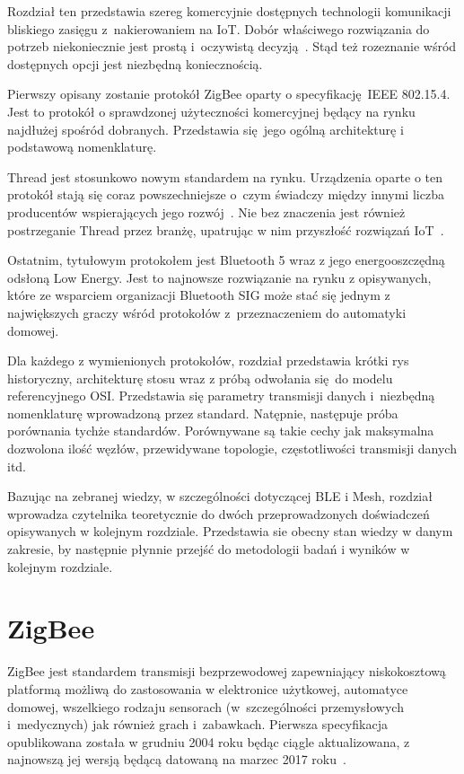Rozdział ten przedstawia szereg komercyjnie dostępnych technologii komunikacji
bliskiego zasięgu z~nakierowaniem na \gls{IoT}. Dobór właściwego rozwiązania do potrzeb
niekoniecznie jest prostą i~oczywistą decyzją~\cite{lethaby_wireless_2017, ray_edge_2019}.
Stąd też rozeznanie wśród dostępnych opcji jest niezbędną koniecznością.

Pierwszy opisany zostanie protokół ZigBee oparty o specyfikację IEEE 802.15.4. Jest to protokół
o sprawdzonej użyteczności komercyjnej będący na rynku najdłużej spośród dobranych.
Przedstawia się jego ogólną architekturę i podstawową nomenklaturę.

Thread jest stosunkowo nowym standardem na rynku. Urządzenia oparte o ten protokół stają
się coraz powszechniejsze o~czym świadczy między innymi liczba producentów wspierających
jego rozwój~\cite{noauthor_thread_nodate-1}. Nie bez znaczenia jest również postrzeganie
Thread przez branżę, upatrując w nim przyszłość rozwiązań IoT~\cite{curtis_ces_nodate-1}.

Ostatnim, tytułowym protokołem jest Bluetooth 5 wraz z jego energooszczędną odsłoną
Low Energy. Jest to najnowsze rozwiązanie na rynku z opisywanych, które ze wsparciem
organizacji Bluetooth SIG może stać się jednym z największych graczy wśród protokołów
z~przeznaczeniem do automatyki domowej.

Dla każdego z wymienionych protokołów, rozdział przedstawia krótki rys historyczny,
architekturę stosu wraz z próbą odwołania się do modelu referencyjnego OSI. Przedstawia
się parametry transmisji danych i~niezbędną nomenklaturę wprowadzoną przez standard.
Natępnie, następuje próba porównania tychże standardów. Porównywane są takie
cechy jak maksymalna dozwolona ilość węzłów, przewidywane topologie,
częstotliwości transmisji danych itd.

Bazując na zebranej wiedzy, w szczególności dotyczącej BLE i Mesh, rozdział wprowadza
czytelnika teoretycznie do dwóch przeprowadzonych doświadczeń opisywanych w kolejnym
rozdziale. Przedstawia sie obecny stan wiedzy w danym zakresie, by następnie płynnie
przejść do metodologii badań i wyników w kolejnym rozdziale.

\section{ZigBee}

ZigBee jest standardem transmisji bezprzewodowej zapewniający niskokosztową platformą
możliwą do zastosowania w elektronice użytkowej, automatyce domowej, wszelkiego rodzaju sensorach
(w~szczególności przemysłowych i~medycznych) jak również grach i~zabawkach.
Pierwsza specyfikacja opublikowana została w grudniu 2004 roku będąc ciągle aktualizowana,
z najnowszą jej wersją będącą datowaną na marzec 2017 roku~\cite{zigbee_alliance_zigbee_2017}.

